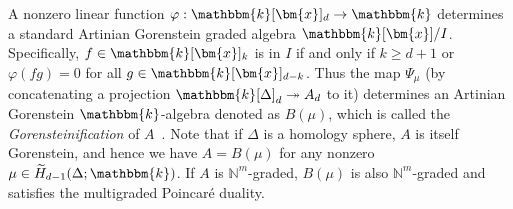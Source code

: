 A nonzero linear function $\varphi:\mathbbm{k}[\bm{x}]_d \rightarrow \mathbbm{k}$ determines a standard Artinian Gorenstein graded algebra $\mathbbm{k}[\bm{x}]/I$. Specifically, $f \in \mathbbm{k}[\bm{x}]_k$ is in $I$ if and only if $k \geq d+1$ or $\varphi(fg)=0$ for all $g \in \mathbbm{k}[\bm{x}]_{d-k}$.
Thus the map $\Psi_\mu$ (by concatenating a projection $\mathbbm{k}[\Delta]_{d} \twoheadrightarrow A_{d}$ to it) determines an Artinian Gorenstein $\mathbbm{k}$-algebra denoted as $B(\mu)$, which is called the \emph{Gorensteinification} of $A$~\cite{APP}.
Note that if $\Delta$ is a homology sphere, $A$ is itself Gorenstein, and hence we have $A=B(\mu)$ for any nonzero $\mu \in \widetilde{H}_{d-1}(\Delta;\mathbbm{k})$.
If $A$ is $\mathbb{N}^m$-graded, $B(\mu)$ is also $\mathbb{N}^m$-graded and satisfies the multigraded Poincar\'{e} duality.

